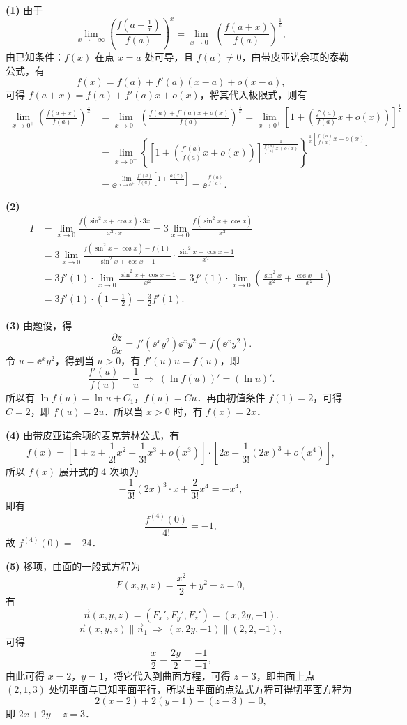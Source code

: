\begin{solution}
  \textbf{(1)} 由于
  \[
    \lim_{x\to+\infty}\left(\frac{f\left(a+\frac{1}{x}\right)}{f(a)}\right)^{x}
    =\lim_{x\to 0^+}\left(\frac{f(a+x)}{f(a)}\right)^{\frac{1}{x}},
  \]
  由已知条件：$f(x)$ 在点 $x=a$ 处可导，且 $f(a)\neq 0$，由带皮亚诺余项的泰勒公式，有
  \[
    f(x)=f(a)+f'(a)(x-a)+o(x-a),
  \]
  可得 $f(a+x)=f(a)+f'(a)x+o(x)$，将其代入极限式，则有
  \begin{align*}
    \lim_{x\to 0^+}\left(\frac{f(a+x)}{f(a)}\right)^{\frac{1}{x}}
    &=\lim_{x\to 0^+}\left(\frac{f(a)+f'(a)x+o(x)}{f(a)}\right)^{\frac{1}{x}}
     =\lim_{x\to 0^+}\left[1+\left(\frac{f'(a)}{f(a)}x+o(x)\right)\right]^{\frac{1}{x}}\\
    &=\lim_{x\to 0^+}\left\{\left[1+\left(\frac{f'(a)}{f(a)}x+o(x)\right)\right]^{\frac{1}{\frac{f'(a)}{f(a)}x+o(x)}}\right\}^{\frac{1}{x}\left[\frac{f'(a)}{f(a)}x+o(x)\right]}\\
    &=\ee^{\lim\limits_{x\to 0^+}\frac{f'(a)}{f(a)}\left[1+\frac{o(x)}{x}\right]}
     =\ee^{\frac{f'(a)}{f(a)}}.
  \end{align*}

  \textbf{(2)}
  \begin{align*}
    I&=\lim_{x\to 0}\frac{f(\sin^2x+\cos x)\cdot 3x}{x^2\cdot x}=3\lim_{x\to 0}\frac{f(\sin^2x+\cos x)}{x^2}\\
    &=3\lim_{x\to 0}\frac{f(\sin^2x+\cos x)-f(1)}{\sin^2x+\cos x-1}\cdot\frac{\sin^2x+\cos x-1}{x^2}\\
    &=3f'(1)\cdot\lim_{x\to 0}\frac{\sin^2x+\cos x-1}{x^2}
     =3f'(1)\cdot\lim_{x\to 0}\left(\frac{\sin^2x}{x^2}+\frac{\cos x-1}{x^2}\right)\\
    &=3f'(1)\cdot\left(1-\frac{1}{2}\right)=\frac{3}{2}f'(1).
  \end{align*}

  \textbf{(3)} 由题设，得
  \[
    \frac{\partial z}{\partial x}=f'(\ee^xy^2)\ee^xy^2=f(\ee^xy^2).
  \]
  令 $u=\ee^xy^2$，得到当 $u>0$，有 $f'(u)u=f(u)$，即
  \[
    \frac{f'(u)}{f(u)}=\frac{1}{u}\ \Rightarrow\ \left(\ln f(u)\right)'=\left(\ln u\right)'.
  \]
  所以有 $\ln f(u)=\ln u+C_1$，$f(u)=Cu$．再由初值条件 $f(1)=2$，可得 $C=2$，即 $f(u)=2u$．所以当 $x>0$ 时，有 $f(x)=2x$．

  \textbf{(4)} 由带皮亚诺余项的麦克劳林公式，有
  \[
    f(x)=\left[1+x+\frac{1}{2!}x^2+\frac{1}{3!}x^3+o(x^3)\right]\cdot\left[2x-\frac{1}{3!}(2x)^3+o(x^4)\right],
  \]
  所以 $f(x)$ 展开式的 4 次项为
  \[
    -\frac{1}{3!}(2x)^3\cdot x+\frac{2}{3!}x^4=-x^4,
  \]
  即有
  \[
    \frac{f^{(4)}(0)}{4!}=-1,
  \]
  故 $f^{(4)}(0)=-24$．

  \textbf{(5)} 移项，曲面的一般式方程为
  \[
    F(x,y,z)=\frac{x^2}{2}+y^2-z=0,
  \]
  有
  \[
    \vec{n}(x,y,z)=\left(F_x',F_y',F_z'\right)=(x,2y,-1).
  \]
  \[
    \vec{n}(x,y,z)\parallel\vec{n}_1\ \Rightarrow\ (x,2y,-1)\parallel(2,2,-1),
  \]
  可得
  \[
    \frac{x}{2}=\frac{2y}{2}=\frac{-1}{-1},
  \]
  由此可得 $x=2$，$y=1$，将它代入到曲面方程，可得 $z=3$，即曲面上点 $(2,1,3)$ 处切平面与已知平面平行，所以由平面的点法式方程可得切平面方程为
  \[
    2(x-2)+2(y-1)-(z-3)=0,
  \]
  即 $2x+2y-z=3$．
\end{solution}

